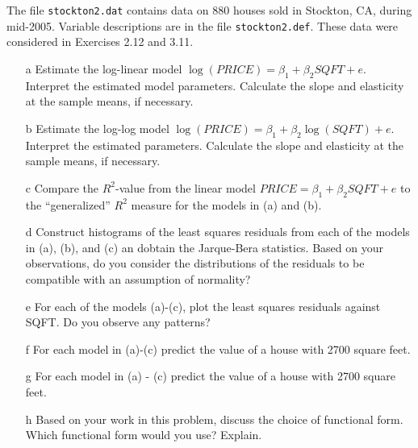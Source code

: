 \documentclass[xcolor={dvipsnames}]{beamer}
\begin{document}
\begin{frame}[allowframebreaks]{4.13}

The file \texttt{stockton2.dat} contains data on 880 houses sold in Stockton, CA, during mid-2005. Variable descriptions are in the file \texttt{stockton2.def}. These data were considered in Exercises 2.12 and 3.11.

\begin{itemize}
	\item[a] Estimate the log-linear model $\log(PRICE) = \beta_1 + \beta_2 SQFT + e$. Interpret the estimated model parameters. Calculate the slope and elasticity at the sample means, if necessary.
	\item[b] Estimate the log-log model $\log(PRICE) = \beta_1 + \beta_2 \log(SQFT) + e$. Interpret the estimated parameters. Calculate the slope and elasticity at the sample means, if necessary.
	\item[c] Compare the $R^2$-value from the linear model $PRICE = \beta_1 + \beta_2 SQFT + e$ to the ``generalized'' $R^2$ measure for the models in (a) and (b).

	\item[d] Construct histograms of the least squares residuals from each of the models in (a), (b), and (c) an dobtain the Jarque-Bera statistics. Based on your observations, do you consider the distributions of the residuals to be compatible with an assumption of normality?
	
	\item[e] For each of the models (a)-(c), plot the least squares residuals against SQFT. Do you observe any patterns?
		
	\item[f] For each model in (a)-(c) predict the value of a house with 2700 square feet.
	
	\item[g] For each model in (a) - (c) predict the value of a house with 2700 square feet.
	
	\item[h] Based on your work in this problem, discuss the choice of functional form. Which functional form would you use? Explain.
	
	
\end{itemize}


\end{frame}
\end{document}
